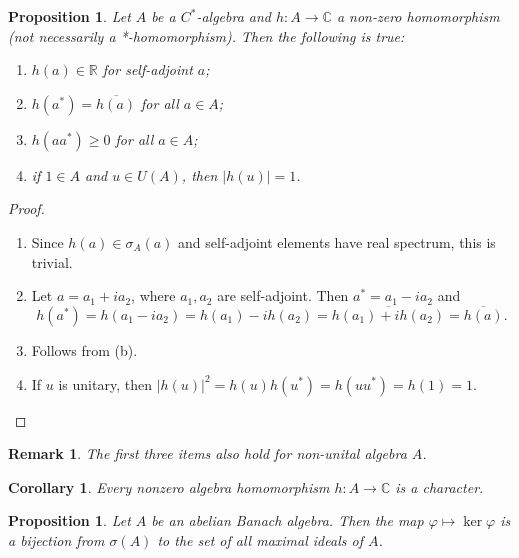 \documentclass[10pt, a4paper]{article}
\newtheorem{corollary}[thm]{Corollary}
\newtheorem{proposition}[thm]{Proposition}
\newtheorem*{remark}{Remark}
\newenvironment{noticeC}{%
  \tcolorbox[%
  notitle,
  empty,
  enhanced,  %
  breakable,
  coltext=black, 
  fontupper=\rmfamily,
  noparskip,
  sharp corners,
  boxrule=-1pt,  %
  frame hidden,
  left=7pt,  %
  right=7pt,
  top=5pt,
  bottom=5pt,
  before skip=2.5ex plus 2pt,
  after skip=2.5ex plus 2pt,
  overlay unbroken and last={%
  },
  ]}
{\endtcolorbox}
\newenvironment{myproof}%
  {\begin{noticeC}\begin{proof}}%
  {\end{proof}\end{noticeC}}
\newcommand{\R}{\mathbb {R}}
\newcommand{\C}{\mathbb {C}}
\begin{document}
\begin{proposition}
  Let $A$ be a $C^*$-algebra and $h: A \to \C$ a non-zero homomorphism (not necessarily a *-homomorphism). 
  Then the following is true:
  \begin{enumerate}
    \item $h(a) \in \R$ for self-adjoint $a$;
    \item $h(a^*) = \overline{h(a)}$ for all $a \in A$;
    \item $h(a a^*) \geq 0$ for all $a \in A$;
    \item if $1 \in A$ and $u \in U(A)$, then $|h(u)| = 1$. 
  \end{enumerate}
\end{proposition}

\begin{myproof}
  \begin{enumerate}
    \item Since $h(a) \in \sigma_A(a)$ and self-adjoint elements have real spectrum, this is trivial.
    \item Let $a = a_1 + i a_2$, where $a_1, a_2$ are self-adjoint. Then $a^* = a_1 - i a_2$ and 
    $$h(a^*) = h(a_1 - i a_2) = h(a_1) - i h(a_2) = \overline{h(a_1) + i h(a_2)} = \overline{h(a)}.$$
    \item Follows from (b).
    \item If $u$ is unitary, then $|h(u)|^2 = h(u) h(u^*) = h(u u^*) = h(1) = 1$.
  \end{enumerate}
\end{myproof}

\begin{remark}
  The first three items also hold for non-unital algebra $A$.
\end{remark}

\begin{corollary}
  Every nonzero algebra homomorphism $h: A \to \C$ is a character.
\end{corollary}

\begin{proposition}
  Let $A$ be an abelian Banach algebra. Then the map $\varphi \mapsto \ker \varphi$
  is a bijection from $\sigma (A)$ to the set of all maximal ideals of $A$.
\end{proposition}
\end{document}
